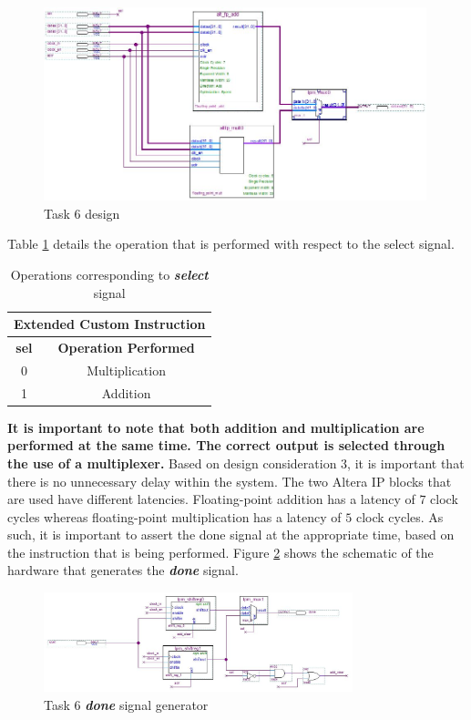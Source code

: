 \documentclass{article}
\begin{document}
\begin{figure}[H]
    \centering
    \includegraphics[width=0.99\textwidth]{task6_bdf_1}
    \caption{Task 6 design}
    \label{fig:task6_bdf_1}
\end{figure}

Table \ref{tab:task6} details the operation that is performed with respect to the select signal. 

\begin{table}[H]
  \centering
    \begin{tabular}{|c|c|}
    \hline
    \multicolumn{2}{|c|}{\textbf{Extended Custom Instruction}}\\
    \hline
    \textbf{sel} & \textbf{Operation Performed} \\
    \hline
    0    & Multiplication \\
    \hline
    1    & Addition \\
    \hline
    \end{tabular}%
  \caption{Operations corresponding to \textbf{\textit{select}} signal}
  \label{tab:task6}%
\end{table}%

\textbf{It is important to note that both addition and multiplication are performed at the same time. The correct output is selected through the use of a multiplexer.} Based on design consideration $3$, it is important that there is no unnecessary delay within the system. The two Altera IP blocks that are used have different latencies. Floating-point addition has a latency of $7$ clock cycles whereas floating-point multiplication has a latency of $5$ clock cycles. As such, it is important to assert the done signal at the appropriate time, based on the instruction that is being performed. Figure \ref{fig:task6_bdf_2} shows the schematic of the hardware that generates the \textbf{\textit{done}} signal.

\begin{figure}[H]
    \centering
    \includegraphics[width=0.8\textwidth]{task6_bdf_2}
    \caption{Task 6 \textbf{\textit{done}} signal generator}
    \label{fig:task6_bdf_2}
\end{figure}
\end{document}
